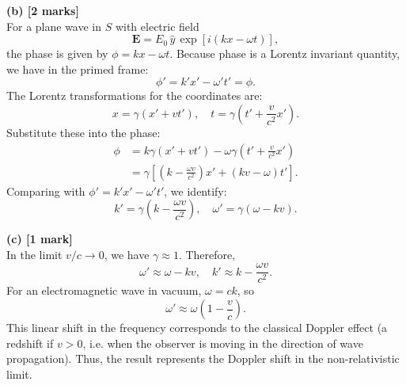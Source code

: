 \documentclass{article}
\begin{document}
\bigskip

\textbf{(b) [2 marks]} \\
For a plane wave in \(S\) with electric field
\[
\mathbf{E} = E_0\,\hat{y}\,\exp\left[i(kx-\omega t)\right],
\]
the phase is given by \(\phi = kx - \omega t\). Because phase is a Lorentz invariant quantity, we have in the primed frame:
\[
\phi' = k'x' - \omega't' = \phi.
\]
The Lorentz transformations for the coordinates are:
\[
x = \gamma (x' + vt'), \quad t = \gamma \left(t' + \frac{v}{c^2} x'\right).
\]
Substitute these into the phase:
\[
\begin{split}
\phi &= k \gamma (x' + vt') - \omega \gamma \left(t' + \frac{v}{c^2} x'\right) \\
&= \gamma \left[ (k - \frac{\omega v}{c^2})x' + (kv-\omega)t'\right].
\end{split}
\]
Comparing with \(\phi' = k'x' - \omega't'\), we identify:
\[
k' = \gamma \left(k - \frac{\omega v}{c^2}\right), \quad \omega' = \gamma (\omega - kv).
\]

\bigskip

\textbf{(c) [1 mark]} \\
In the limit \(v/c\to 0\), we have \(\gamma\approx 1\). Therefore,
\[
\omega' \approx \omega - kv, \quad k' \approx k - \frac{\omega v}{c^2}.
\]
For an electromagnetic wave in vacuum, \(\omega = ck\), so
\[
\omega' \approx \omega\left(1 - \frac{v}{c}\right).
\]
This linear shift in the frequency corresponds to the classical Doppler effect (a redshift if \(v>0\), i.e. when the observer is moving in the direction of wave propagation). Thus, the result represents the Doppler shift in the non-relativistic limit.
\end{document}
